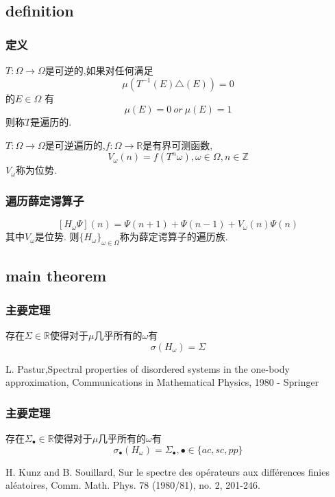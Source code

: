 \documentclass[compress,mathserif,red]{beamer}
\begin{document}
\subsection{definition} %
\begin{frame}
\frametitle{定义}
\begin{definition}
$T:\Omega\rightarrow\Omega$是可逆的,如果对任何满足
$$\mu(T^{-1}(E)\triangle(E))=0$$
的$E \in \Omega$
有$$\mu(E)=0 \  or \  \mu(E)=1$$
则称$T$是遍历的.
\end{definition}
\begin{definition}
$T:\Omega\rightarrow\Omega$是可逆遍历的,$f:\Omega \rightarrow \mathbb{R}$是有界可测函数,
$$V_\omega(n)=f(T^n \omega),\omega \in \Omega, n \in \mathbb{Z}$$
$V_\omega$称为位势.
\end{definition}

\end{frame}

\begin{frame}
\frametitle{遍历薛定谔算子}
\begin{definition}
$$[H_\omega \Psi](n)=\Psi(n+1)+\Psi(n-1)+V_\omega(n)\Psi(n)$$
其中$V_\omega$是位势.
则${ \{ H_\omega \} }_{\omega \in \Omega}$称为薛定谔算子的遍历族.
\end{definition}
\end{frame}

\subsection{main theorem} %
\begin{frame}
\frametitle{主要定理}
\begin{theorem}
存在$\Sigma \in \mathbb{R}$使得对于$\mu$几乎所有的$\omega$有
$$\sigma(H_\omega)=\Sigma$$
\end{theorem}

\medskip
L. Pastur,Spectral properties of disordered systems in the one-body approximation,
Communications in Mathematical Physics, 1980 - Springer
\end{frame}

\begin{frame}
\frametitle{主要定理}
\begin{theorem}
存在$\Sigma_\bullet \in \mathbb{R}$使得对于$\mu$几乎所有的$\omega$有
$$\sigma_\bullet(H_\omega)=\Sigma_\bullet,\bullet \in { \{ac,sc,pp \} }$$
\end{theorem}

\medskip
H. Kunz and B. Souillard, Sur le spectre des op\'erateurs aux différences finies al\'eatoires,
Comm. Math. Phys. 78 (1980/81), no. 2, 201-246.
\end{frame}
\end{document}
